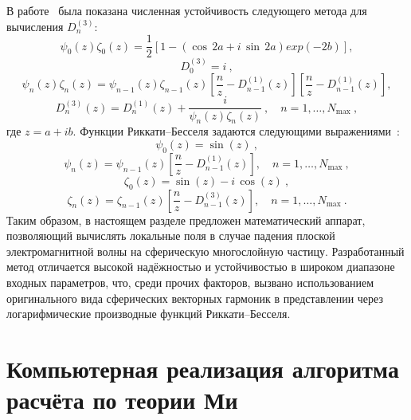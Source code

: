 В работе~\cite{Mackowski-1990} была показана численная устойчивость
следующего метода для вычисления $D_n^{(3)}$:
\begin{equation*}
  \label{eq:pena18a}
  \psi_0(z)\zeta_0(z)=\frac{1}{2}
\left[
1-(\cos\,2a+i\,\sin\,2a)exp(-2b)
\right],
\end{equation*}
\begin{equation*}
  \label{eq:pena18b}
D_0^{(3)} = i\:,
\end{equation*}
\begin{equation*}
  \label{eq:pena18c}
  \psi_n(z)\zeta_n(z)=   \psi_{n-1}(z)\zeta_{n-1}(z)
\left[
\frac{n}{z}-D_{n-1}^{(1)}(z)
\right]
\left[
\frac{n}{z}-D_{n-1}^{(1)}(z)
\right],
\end{equation*}
\begin{equation*}
  \label{eq:pena18d}
D_n^{(3)}(z) = D_n^{(1)}(z)+\frac{i}{\psi_n(z)\zeta_n(z)}\:,\quad
n=1,\ldots, N_{\max}\:,
\end{equation*}
где $z=a+ib$. Функции Риккати--Бесселя задаются следующими
выражениями~\cite{Wiscombe-1980,Mackowski-1990}:
\begin{equation*}
  \label{eq:pena20a}
  \psi_0(z) = \sin(z)\:,
\end{equation*}
\begin{equation*}
  \label{eq:pena20b}
\psi_n(z) = \psi_{n-1}(z)
\left[
\frac{n}{z}-D_{n-1}^{(1)}(z)
\right], \quad n=1,\ldots, N_{\max}\:,
\end{equation*}
\begin{equation*}
  \label{eq:pena21a}
\zeta_0(z) = \sin(z) - i\,\cos(z)\:,
\end{equation*}
\begin{equation*}
  \label{eq:pena21b}
\zeta_n(z) = \zeta_{n-1}(z)
\left[
\frac{n}{z}-D_{n-1}^{(3)}(z)
\right], \quad n=1,\ldots, N_{\max}\:.
\end{equation*}
Таким образом, в настоящем разделе предложен математический аппарат,
позволяющий вычислять локальные поля в случае падения плоской
электромагнитной волны на сферическую многослойную
частицу. Разработанный метод отличается высокой надёжностью и
устойчивостью в широком диапазоне входных параметров, что, среди
прочих факторов, вызвано использованием оригинального вида сферических
векторных гармоник в представлении через логарифмические производные
функций Риккати--Бесселя.


\section{Компьютерная реализация алгоритма расчёта по теории Ми}
\label{sec:code}

